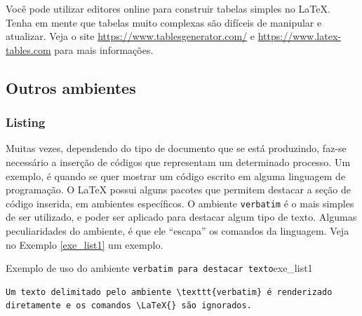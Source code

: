 


\begin{marker}
    Você pode utilizar editores online para construir tabelas simples no \LaTeX{}. Tenha em mente que tabelas muito complexas são difíceis de manipular e atualizar. Veja o site \url{https://www.tablesgenerator.com/} e \url{https://www.latex-tables.com} para mais informações.
\end{marker}

\subsection{Outros ambientes}
\label{sec:out_ambs}


\subsubsection*{Listing}
\label{sec:listing}


Muitas vezes, dependendo do tipo de documento que se está produzindo, faz-se necessário a inserção de códigos que representam um determinado processo. Um exemplo, é quando se quer mostrar um código escrito em alguma linguagem de programação. O \LaTeX{} possui alguns pacotes que permitem destacar a seção de código inserida, em ambientes específicos. O ambiente {\tt verbatim} é o mais simples de ser utilizado, e poder ser aplicado para destacar algum tipo de texto. Algumas peculiaridades do ambiente, é que ele ``escapa'' os comandos da linguagem. Veja no Exemplo \ref{exe_list1} um exemplo.

\begin{texexptitled}[breakable,center lower,enhanced,middle=2mm]{Exemplo de uso do ambiente {\tt verbatim para destacar texto}}{exe_list1}
\begin{verbatim}
Um texto delimitado pelo ambiente \texttt{verbatim} é renderizado 
diretamente e os comandos \LaTeX{} são ignorados.
\end{verbatim}
\end{texexptitled}

